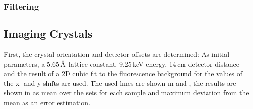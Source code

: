 \subsubsection{Filtering}
\subsection{Imaging Crystals}

First, the crystal orientation and detector offsets are determined: As initial parameters, a 5.65\,\AA\, lattice constant, 9.25\,keV energy, 14\,cm detector distance and the result of a 2D cubic fit to the fluorescence background for the values of the x- and y-shifts are used. The used lines are shown in  and , the results are shown in  as mean over the sets for each sample and maximum deviation from the mean as an error estimation.

